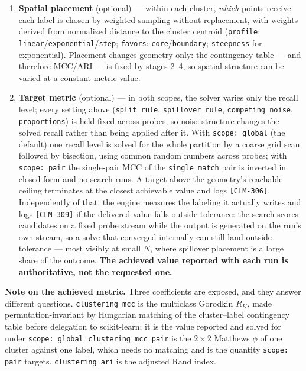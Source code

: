 \documentclass[a4paper,12pt]{article}
\begin{document}
\begin{enumerate}
    \item \textbf{Spatial placement} (optional) — within each cluster, \emph{which} points receive each label is chosen by weighted sampling without replacement, with weights derived from normalized distance to the cluster centroid (\texttt{profile}: \texttt{linear}/\texttt{exponential}/\texttt{step}; \texttt{favors}: \texttt{core}/\texttt{boundary}; \texttt{steepness} for exponential). Placement changes geometry only: the contingency table — and therefore MCC/ARI — is fixed by stages 2--4, so spatial structure can be varied at a constant metric value.
    \item \textbf{Target metric} (optional) — in both scopes, the solver varies only the recall level; every setting above (\texttt{split\_rule}, \texttt{spillover\_rule}, \texttt{competing\_noise}, \texttt{proportions}) is held fixed across probes, so noise structure changes the solved recall rather than being applied after it. With \texttt{scope: global} (the default) one recall level is solved for the whole partition by a coarse grid scan followed by bisection, using common random numbers across probes; with \texttt{scope: pair} the single-pair MCC of the \texttt{single\_match} pair is inverted in closed form and no search runs. A target above the geometry's reachable ceiling terminates at the closest achievable value and logs \texttt{[CLM-306]}. Independently of that, the engine measures the labeling it actually writes and logs \texttt{[CLM-309]} if the delivered value falls outside tolerance: the search scores candidates on a fixed probe stream while the output is generated on the run's own stream, so a solve that converged internally can still land outside tolerance --- most visibly at small $N$, where spillover placement is a large share of the outcome. \textbf{The achieved value reported with each run is authoritative, not the requested one.}
\end{enumerate}

\vspace{0.5em}
\noindent\textbf{Note on the achieved metric.} Three coefficients are exposed, and they answer different questions. \texttt{clustering\_mcc} is the multiclass Gorodkin $R_K$, made permutation-invariant by Hungarian matching of the cluster--label contingency table before delegation to scikit-learn; it is the value reported and solved for under \texttt{scope: global}. \texttt{clustering\_mcc\_pair} is the $2\times2$ Matthews $\phi$ of one cluster against one label, which needs no matching and is the quantity \texttt{scope: pair} targets. \texttt{clustering\_ari} is the adjusted Rand index.
\end{document}
